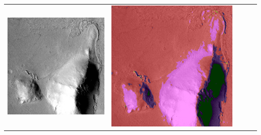 \begin{table}[h!]
\begin{tabularx}{\textwidth}{>{\centering}m{}
			>{\centering}m{}
			>{\centering}m{}
			>{\centering}m{}
			>{\centering\arraybackslash}m{}}
		\includegraphics[width=0.9\linewidth]{images/p03/p03_04.png} &
		\includegraphics[width=0.9\linewidth]{images/gen/fully_connected/p03_04.png_0.png} &

\end{tabularx}
\end{table}
